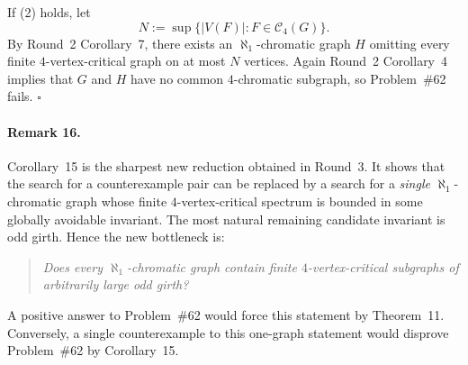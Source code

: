 If (2) holds, let
\[
N:=\sup\{|V(F)|:F\in \mathcal C_4(G)\}.
\]
By Round~2 Corollary~7, there exists an $\aleph_1$-chromatic graph $H$ omitting every finite $4$-vertex-critical graph on at most $N$ vertices.
Again Round~2 Corollary~4 implies that $G$ and $H$ have no common $4$-chromatic subgraph, so Problem~\#62 fails.
\hfill$\square$

\paragraph{Remark 16.}
Corollary~15 is the sharpest new reduction obtained in Round~3.
It shows that the search for a counterexample pair can be replaced by a search for a \emph{single} $\aleph_1$-chromatic graph whose finite $4$-vertex-critical spectrum is bounded in some globally avoidable invariant.
The most natural remaining candidate invariant is odd girth.
Hence the new bottleneck is:
\begin{quote}
\emph{Does every $\aleph_1$-chromatic graph contain finite $4$-vertex-critical subgraphs of arbitrarily large odd girth?}
\end{quote}
A positive answer to Problem~\#62 would force this statement by Theorem~11.
Conversely, a single counterexample to this one-graph statement would disprove Problem~\#62 by Corollary~15.

